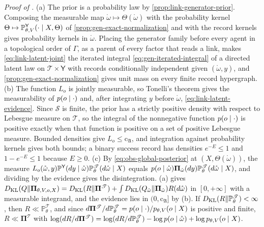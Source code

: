 \noindent\emph{Proof of .}
(a) The prior is a probability law by \cref{prop:link-generator-prior}. Composing the measurable map
$\mathring\omega\mapsto\Theta(\mathring\omega)$ with the probability kernel
$\Theta\mapsto\mathbb P^{\mathsf Y}_{\theta,V}(\cdot\mid X,\Theta)$ of \cref{prop:gen-exact-normalization}
and with the record kernels gives probability kernels in $\mathring\omega$. Placing the generator family
before every agent in a topological order of $\Gamma$, as a parent of every factor that reads a link, makes
\eqref{eq:link-latent-joint} the iterated integral \eqref{eq:gen-iterated-integral} of a directed latent law
on $\mathscr T\times\mathsf Y$ with records conditionally independent given $(\mathring\omega,y)$, and
\cref{prop:gen-exact-normalization} gives unit mass on every finite record hypergraph. (b) The function
$L_o$ is jointly measurable, so Tonelli's theorem gives the measurability of $p(o\mid\cdot)$ and, after
integrating $y$ before $\mathring\omega$, \eqref{eq:link-latent-evidence}. Since $\mathscr S$ is finite, the
prior has a strictly positive density with respect to Lebesgue measure on $\mathscr T$, so the integral of
the nonnegative function $p(o\mid\cdot)$ is positive exactly when that function is positive on a set of
positive Lebesgue measure. Bounded densities give $L_o\leq\mathrm c_{\mathfrak A}$, and integration against probability
kernels gives both bounds; a binary success record has densities $e^{-E}\leq1$ and $1-e^{-E}\leq1$ because
$E\geq0$. (c) By \eqref{eq:obs-global-posterior} at $(X,\Theta(\mathring\omega))$, the measure
$L_o(\mathring\omega,y)\mathbb P^{\mathsf Y}(dy\mid\mathring\omega)\mathbb P^{\mathscr T}_\theta(d\mathring\omega\mid X)$
equals $p(o\mid\mathring\omega)\boldsymbol\Pi_{\mathring\omega}(dy)\mathbb P^{\mathscr T}_\theta(d\mathring\omega\mid X)$,
and dividing by the evidence gives the disintegration. (a) gives
$D_{\mathrm{KL}}(Q\Vert\boldsymbol\Pi_{\theta,V,o,X})=D_{\mathrm{KL}}(R\Vert\boldsymbol\Pi^{\mathscr T})+\int D_{\mathrm{KL}}(Q_{\mathring\omega}\Vert\boldsymbol\Pi_{\mathring\omega})R(d\mathring\omega)$
in $[0,+\infty]$ with a measurable integrand, and the evidence lies in $(0,\mathrm c_{\mathfrak A}]$ by (b). If
$D_{\mathrm{KL}}(R\Vert\mathbb P^{\mathscr T}_\theta)<\infty$, then
$R\ll\mathbb P^{\mathscr T}_\theta$, and since
$d\boldsymbol\Pi^{\mathscr T}/d\mathbb P^{\mathscr T}_\theta=p(o\mid\cdot)/p_{\theta,V}(o\mid X)$ is positive
and finite, $R\ll\boldsymbol\Pi^{\mathscr T}$ with
$\log(dR/d\boldsymbol\Pi^{\mathscr T})=\log(dR/d\mathbb P^{\mathscr T}_\theta)-\log p(o\mid\mathring\omega)+\log p_{\theta,V}(o\mid X)$.
